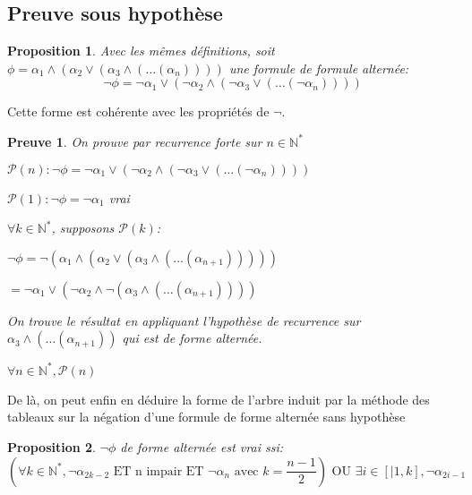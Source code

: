 \documentclass{paper}
\newtheorem{prop}{Proposition}
\newtheorem{preuve}{Preuve}
\begin{document}
\subsection{Preuve sous hypothèse}

\begin{prop}
    Avec les mêmes définitions, soit $\phi = \alpha_1 \land (\alpha_2 \lor (\alpha_3 \land (\dots (\alpha_n))))$ une formule de formule alternée:
    $$\lnot\phi = \lnot\alpha_1 \lor (\lnot\alpha_2 \land (\lnot\alpha_3 \lor (\dots (\lnot\alpha_n))))$$
\end{prop}
Cette forme est cohérente avec les propriétés de $\lnot$.

\begin{preuve}
    On prouve par recurrence forte sur $n\in\mathbb{N}^*$

    $\mathcal{P}(n): \lnot\phi = \lnot\alpha_1 \lor (\lnot\alpha_2 \land (\lnot\alpha_3 \lor (\dots (\lnot\alpha_n))))$

    $\mathcal{P}(1): \lnot\phi = \lnot\alpha_1$ vrai

    $\forall k\in\mathbb{N}^*$, supposons $\mathcal{P}(k)$:

    $\lnot\phi = \lnot (\alpha_1 \land (\alpha_2 \lor (\alpha_3 \land (\dots (\alpha_{n+1})))))$

    $= \lnot\alpha_1 \lor (\lnot\alpha_2 \land \lnot(\alpha_3 \land (\dots (\alpha_{n+1}))))$

    On trouve le résultat en appliquant l'hypothèse de recurrence sur $\alpha_3 \land (\dots (\alpha_{n+1}))$ qui est de forme alternée.

    $\forall n\in\mathbb{N}^*, \mathcal{P}(n)$
\end{preuve}

De là, on peut enfin en déduire la forme de l'arbre induit par la méthode des tableaux sur la négation d'une formule de forme alternée sans hypothèse


\begin{prop}
    $\lnot\phi$ de forme alternée est vrai ssi:
    $$(\forall k\in\mathbb{N}^*, \lnot\alpha_{2k-2} \text{ ET n impair ET } \lnot\alpha_n \text{ avec } k=\frac{n-1}{2}) \text{ OU } \exists i\in [|1,k], \lnot\alpha_{2i-1}$$
\end{prop}
\end{document}
